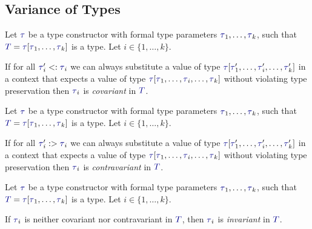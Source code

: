 \subsection{Variance of Types}\label{subsec:Type_Variance}
\begin{definition}[Covariance]\label{def:Type_Covariance}
  Let $\DataType$ be a type constructor with formal type parameters $\DataType_{1}, \ldots , \DataType_{k}$, such that $\SemanticType{T} = \DataType [\DataType_{1}, \ldots, \DataType_{k}]$ is a type.
  Let $i \in \lbrace 1,\ldots, k \rbrace$.

  If for all $\DataType_{i}' <: \DataType_{i}$ we can always substitute a value of type $\DataType [\DataType_{1}',\ldots, \DataType_{i}', \ldots, \DataType_{k}']$ in a context that expects a value of type $\DataType [\DataType_{1}, \ldots, \DataType_{i}, \ldots, \DataType_{k}]$ without violating type preservation then $\DataType_{i}$ is \emph{covariant} in $\SemanticType{T}$.
\end{definition}

\begin{definition}[Contravariance]\label{Type_Contravariance}
  Let $\DataType$ be a type constructor with formal type parameters $\DataType_{1}, \ldots , \DataType_{k}$, such that $\SemanticType{T} = \DataType [\DataType_{1}, \ldots, \DataType_{k}]$ is a type.
  Let $i \in \lbrace 1,\ldots, k \rbrace$.

  If for all $\DataType_{i}' :> \DataType_{i}$ we can always substitute a value of type $\DataType [\DataType_{1}',\ldots, \DataType_{i}', \ldots, \DataType_{k}']$ in a context that expects a value of type $\DataType [\DataType_{1}, \ldots, \DataType_{i}, \ldots, \DataType_{k}]$ without violating type preservation then $\DataType_{i}$ is \emph{contravariant} in $\SemanticType{T}$.
\end{definition}

\begin{definition}[Invariance]\label{def:Type_Invariance}
  Let $\DataType$ be a type constructor with formal type parameters $\DataType_{1}, \ldots , \DataType_{k}$, such that $\SemanticType{T} = \DataType [\DataType_{1}, \ldots, \DataType_{k}]$ is a type.
  Let $i \in \lbrace 1,\ldots, k \rbrace$.


  If $\DataType_{i}$ is neither covariant nor contravariant in $\SemanticType{T}$, then $\DataType_{i}$ is \emph{invariant} in $\SemanticType{T}$.
\end{definition}

